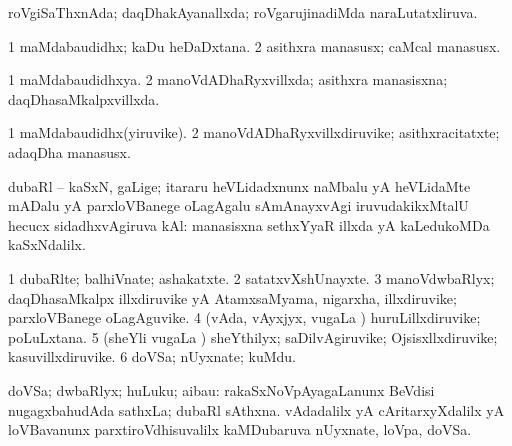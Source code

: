 {\bentry
{} 
\gl{\gu}
\bmng
roVgiSaThxnAda; daqDhakAyanallxda; roVgarujinadiMda naraLutatxliruva. 
\emng
\eentry

\bentry
{} 
\gl{\nA}
\expl{}
\bmng
\bnum
\num{1} maMdabaudidhx; kaDu heDaDxtana. 
\num{2} asithxra manasusx; caMcal manasusx. 
\enum
\emng
\eentry

\bentry
{} 
\gl{\gu}
\expl{}
\bmng
\bnum
\num{1} maMdabaudidhxya. 
\num{2} manoVdADhaRyxvillxda; asithxra manasisxna; daqDhasaMkalpxvillxda. 
\enum
\emng
\eentry

\bentry
{} 
\gl{\nA}
\expl{}
\bmng
\bnum
\num{1} maMdabaudidhx(yiruvike). 
\num{2} manoVdADhaRyxvillxdiruvike; asithxracitatxte; adaqDha manasusx. 
\enum
\emng
\eentry

\bentry
{} 
\gl{\nA}
\bmng
dubaRl -- kaSxN, gaLige; itararu heVLidadxnunx naMbalu yA heVLidaMte mADalu yA parxloVBanege oLagAgalu sAmAnayxvAgi iruvudakikxMtalU hecucx sidadhxvAgiruva kAl:  manasisxna sethxYyaR illxda yA kaLedukoMDa kaSxNdalilx. 
\emng
\eentry

\bentry
{}
\gl{\nA}
\bmng
{} 
\emng
\eentry

\bentry
{} 
\gl{\nA}
\expl{}
\bmng
\bnum
\num{1} dubaRlte; balhiVnate; ashakatxte. 
\num{2} satatxvXshUnayxte. 
\num{3} manoVdwbaRlyx; daqDhasaMkalpx illxdiruvike yA AtamxsaMyama, nigarxha, illxdiruvike; parxloVBanege oLagAguvike. 
\num{4} (vAda, vAyxjyx, \mo vugaLa \vi) huruLillxdiruvike; poLuLxtana. 
\num{5} (sheYli \mo vugaLa \vi) sheYthilyx; saDilvAgiruvike; Ojsisxllxdiruvike; kasuvillxdiruvike. 
\num{6} doVSa; nUyxnate; kuMdu. 
\enum
\emng
\eentry

\bentry
{} 
\gl{\nA}
\expl{}
\bmng
doVSa; dwbaRlyx; huLuku; aibau: 
\banum
{} rakaSxNoVpAyagaLanunx BeVdisi nugagxbahudAda sathxLa; dubaRl sAthxna. 
 vAdadalilx yA cAritarxyXdalilx yA loVBavanunx parxtiroVdhisuvalilx kaMDubaruva nUyxnate, loVpa, doVSa. 
\eanum
\emng
\eentry

\bentry
{} 
\gl{\nA}
\expl{}
\bmng
{} 
\emng
\eentry

}
